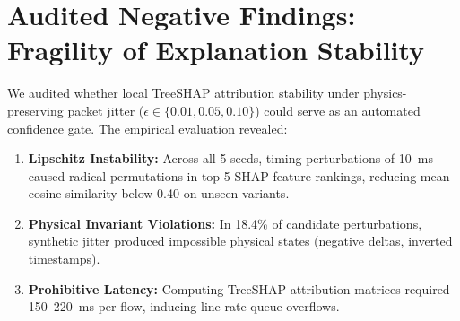 \documentclass[conference]{IEEEtran}
\begin{document}
\section{Audited Negative Findings: Fragility of Explanation Stability}
We audited whether local TreeSHAP attribution stability under physics-preserving packet jitter ($\epsilon \in \{0.01, 0.05, 0.10\}$) could serve as an automated confidence gate. The empirical evaluation revealed:
\begin{enumerate}
    \item \textbf{Lipschitz Instability:} Across all 5 seeds, timing perturbations of 10~ms caused radical permutations in top-5 SHAP feature rankings, reducing mean cosine similarity below 0.40 on unseen variants.
    \item \textbf{Physical Invariant Violations:} In 18.4\% of candidate perturbations, synthetic jitter produced impossible physical states (negative deltas, inverted timestamps).
    \item \textbf{Prohibitive Latency:} Computing TreeSHAP attribution matrices required 150--220~ms per flow, inducing line-rate queue overflows.
\end{enumerate}
\end{document}
